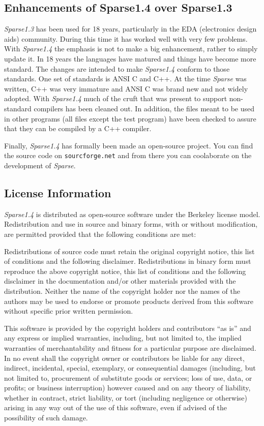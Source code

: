 \documentclass[11pt]{article}
\begin{document}
\subsection {Enhancements of Sparse1.4 over Sparse1.3}

\emph{Sparse1.3} has been used for 18 years, particularly in the EDA
(electronics design aids) community. During this time it has worked
well with very few problems. With \emph{Sparse1.4} the emphasis is not
to make a big enhancement, rather to simply update it. In 18 years the
languages have matured and things have become more standard. The
changes are intended to make \emph{Sparse1.4} conform to those
standards. One set of standards is ANSI C and C++. At the time
\emph{Sparse} was written, C++ was very immature and ANSI C was brand
new and not widely adopted. With \emph{Sparse1.4} much of the cruft
that was present to support non-standard compilers has been cleaned
out. In addition, the files meant to be used in other programs (all
files except the test program) have been checked to assure that they
can be compiled by a C++ compiler.

Finally, \emph{Sparse1.4} has formally been made an open-source
project. You can find the source code on \verb=sourcforge.net= and
from there you can coolaborate on the development of \emph{Sparse}.

\subsection{License Information}

\emph{Sparse1.4} is distributed as open-source software under the
Berkeley license model. Redistribution and use in source and binary
forms, with or without modification, are permitted provided that the
following conditions are met:

Redistributions of source code must retain the original copyright notice,
this list of conditions and the following disclaimer.  Redistributions
in binary form must reproduce the above copyright notice, this list
of conditions and the following disclaimer in the documentation and/or
other materials provided with the distribution.  Neither the name of
the copyright holder nor the names of the authors may be used to endorse
or promote products derived from this software without specific prior
written permission.

This software is provided by the copyright holders and contributors
``as is'' and any express or implied warranties, including, but not
limited to, the implied warranties of merchantability and fitness for
a particular purpose are disclaimed. In no event shall the copyright
owner or contributors be liable for any direct, indirect, incidental,
special, exemplary, or consequential damages (including, but not
limited to, procurement of substitute goods or services; loss of use, data, or
profits; or business interruption) however caused and on any theory of
liability, whether in contract, strict liability, or tort (including
negligence or otherwise) arising in any way out of the use of this
software, even if advised of the possibility of such damage.
\end{document}
